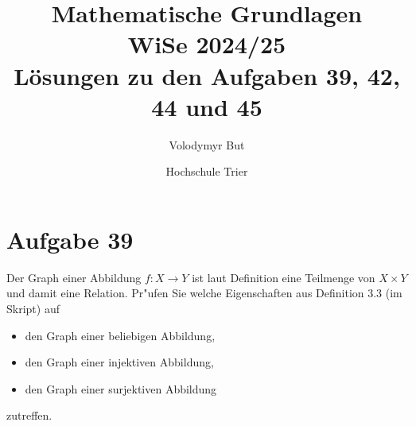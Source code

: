 \documentclass[10pt, oneside]{article}
\title{Mathematische Grundlagen\\[10pt]\Large{WiSe 2024/25}\\[15pt]\Large{L{\"o}sungen zu den Aufgaben 39, 42, 44 und 45}}
\author{Volodymyr But}
\date{Hochschule Trier}
\begin{document}
\sloppy

\maketitle
\vspace{25px}

\section{Aufgabe 39}

Der Graph einer Abbildung $f: X \rightarrow Y$ ist laut Definition eine
Teilmenge von $X \times Y$ und damit eine Relation. Pr"ufen Sie welche
Eigenschaften aus Definition 3.3 (im Skript) auf
\begin{itemize}
    \item den Graph einer beliebigen Abbildung,
    \item den Graph einer injektiven Abbildung,
    \item den Graph einer surjektiven Abbildung
\end{itemize}
zutreffen.
\end{document}
